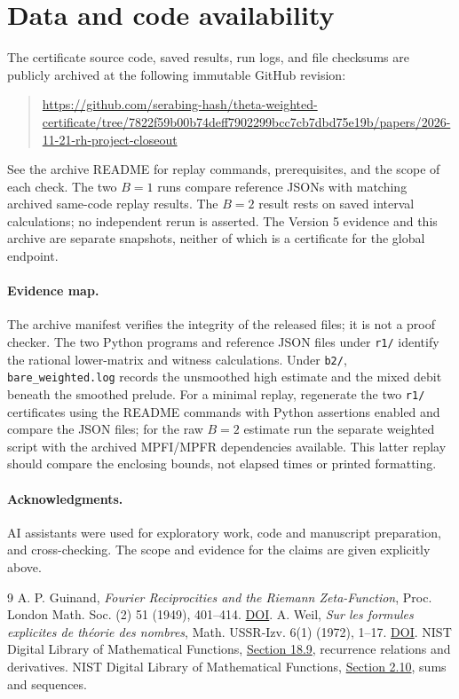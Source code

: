 \documentclass[11pt]{article}
\newcommand{\ArtifactURL}{https://github.com/serabing-hash/theta-weighted-certificate/tree/7822f59b00b74deff7902299bcc7cb7dbd75e19b/papers/2026-11-21-rh-project-closeout}
\begin{document}
\clearpage
\section{Data and code availability}
The certificate source code, saved results, run logs, and file checksums are publicly archived at the following immutable GitHub revision:
\begin{quote}\small\raggedright\expandafter\url\expandafter{\ArtifactURL}\end{quote}
See the archive README for replay commands, prerequisites, and the scope of each check. The two $B=1$ runs compare reference JSONs with matching archived same-code replay results. The $B=2$ result rests on saved interval calculations; no independent rerun is asserted. The Version 5 evidence and this archive are separate snapshots, neither of which is a certificate for the global endpoint.

\paragraph{Evidence map.}
The archive manifest verifies the integrity of the released files; it is not a proof checker. The two Python programs and reference JSON files under \texttt{r1/} identify the rational lower-matrix and witness calculations. Under \texttt{b2/}, \texttt{bare\_weighted.log} records the unsmoothed high estimate and the mixed debit beneath the smoothed prelude. For a minimal replay, regenerate the two \texttt{r1/} certificates using the README commands with Python assertions enabled and compare the JSON files; for the raw $B=2$ estimate run the separate weighted script with the archived MPFI/MPFR dependencies available. This latter replay should compare the enclosing bounds, not elapsed times or printed formatting.

\paragraph{Acknowledgments.}
AI assistants were used for exploratory work, code and manuscript preparation, and cross-checking. The scope and evidence for the claims are given explicitly above.

\begin{thebibliography}{9}
 A. P. Guinand, \emph{Fourier Reciprocities and the Riemann Zeta-Function}, Proc. London Math. Soc. (2) 51 (1949), 401--414. \href{https://doi.org/10.1112/plms/s2-51.6.401}{DOI}.
 A. Weil, \emph{Sur les formules explicites de th\'eorie des nombres}, Math. USSR-Izv. 6(1) (1972), 1--17. \href{https://doi.org/10.1070/IM1972v006n01ABEH001866}{DOI}.
 NIST Digital Library of Mathematical Functions, \href{https://dlmf.nist.gov/18.9}{Section 18.9}, recurrence relations and derivatives.
 NIST Digital Library of Mathematical Functions, \href{https://dlmf.nist.gov/2.10}{Section 2.10}, sums and sequences.
\end{thebibliography}
\end{document}
